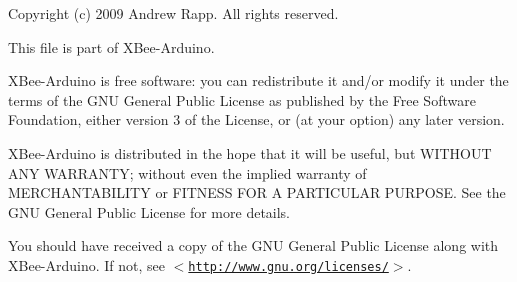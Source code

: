 \-Copyright (c) 2009 \-Andrew \-Rapp. \-All rights reserved.

\-This file is part of \-X\-Bee-\/\-Arduino.

\-X\-Bee-\/\-Arduino is free software\-: you can redistribute it and/or modify it under the terms of the \-G\-N\-U \-General \-Public \-License as published by the \-Free \-Software \-Foundation, either version 3 of the \-License, or (at your option) any later version.

\-X\-Bee-\/\-Arduino is distributed in the hope that it will be useful, but \-W\-I\-T\-H\-O\-U\-T \-A\-N\-Y \-W\-A\-R\-R\-A\-N\-T\-Y; without even the implied warranty of \-M\-E\-R\-C\-H\-A\-N\-T\-A\-B\-I\-L\-I\-T\-Y or \-F\-I\-T\-N\-E\-S\-S \-F\-O\-R \-A \-P\-A\-R\-T\-I\-C\-U\-L\-A\-R \-P\-U\-R\-P\-O\-S\-E. \-See the \-G\-N\-U \-General \-Public \-License for more details.

\-You should have received a copy of the \-G\-N\-U \-General \-Public \-License along with \-X\-Bee-\/\-Arduino. \-If not, see $<$\href{http://www.gnu.org/licenses/}{\tt http\-://www.\-gnu.\-org/licenses/}$>$. 

